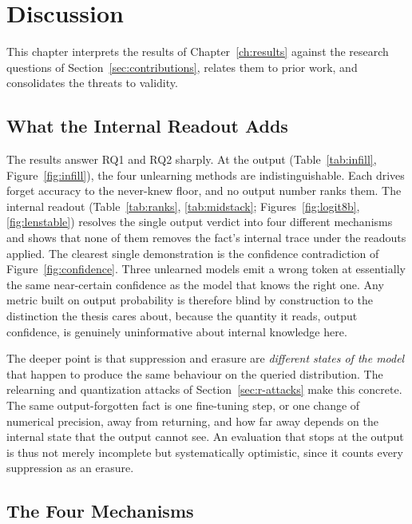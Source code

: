 \chapter{Discussion}
\label{ch:discussion}

This chapter interprets the results of Chapter~\ref{ch:results} against the research questions of
Section~\ref{sec:contributions}, relates them to prior work, and consolidates the threats to validity.

\section{What the Internal Readout Adds}
\label{sec:d-internal}

The results answer RQ1 and RQ2 sharply. At the output (Table~\ref{tab:infill},
Figure~\ref{fig:infill}), the four unlearning methods are indistinguishable. Each drives forget accuracy to
the never-knew floor, and no output number ranks them. The internal readout
(Table~\ref{tab:ranks}, \ref{tab:midstack}; Figures~\ref{fig:logit8b}, \ref{fig:lenstable}) resolves the
single output verdict into four different mechanisms and shows that none of them removes the fact's
internal trace under the readouts applied.
The clearest single demonstration is the confidence contradiction of Figure~\ref{fig:confidence}. Three
unlearned models emit a wrong token at essentially the same near-certain confidence as the model that
knows the right one. Any metric built on output probability is therefore blind by construction to the
distinction the thesis cares about, because the quantity it reads, output confidence, is genuinely
uninformative about internal knowledge here.

The deeper point is that suppression and erasure are \emph{different states of the model} that happen to
produce the same behaviour on the queried distribution. The relearning and quantization attacks of
Section~\ref{sec:r-attacks} make this concrete. The same output-forgotten fact is one fine-tuning step, or
one change of numerical precision, away from returning, and how far away depends on the internal state that
the output cannot see. An evaluation that stops at the output is thus not merely incomplete but
systematically optimistic, since it counts every suppression as an erasure.

\section{The Four Mechanisms}
\label{sec:d-mechanisms}

